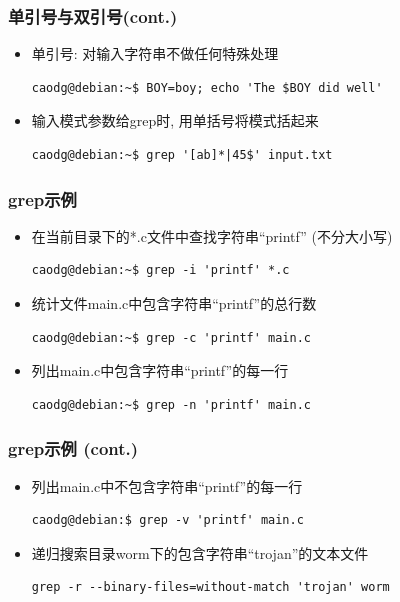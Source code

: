 \documentclass[compress]{beamer}
\begin{document}
\begin{frame}[fragile]
\frametitle{单引号与双引号(cont.)}
\begin{itemize}
\item 单引号: 对输入字符串不做任何特殊处理\\[1em]
\begin{Verbatim}
caodg@debian:~$ BOY=boy; echo 'The $BOY did well'
\end{Verbatim}

\item 输入模式参数给{grep}时, 用单括号将模式括起来\\[1em]
\begin{Verbatim}
caodg@debian:~$ grep '[ab]*|45$' input.txt
\end{Verbatim}
\end{itemize}
\end{frame}

\begin{frame}[fragile]
\frametitle{grep示例}

\begin{itemize}
\item 在当前目录下的*.c文件中查找字符串``printf''
(不分大小写)\\
\begin{Verbatim}
caodg@debian:~$ grep -i 'printf' *.c
\end{Verbatim}

\item 统计文件main.c中包含字符串``printf''的总行数\\
\begin{Verbatim}
caodg@debian:~$ grep -c 'printf' main.c
\end{Verbatim}

\item 列出main.c中包含字符串``printf''的每一行\\
\begin{Verbatim}
caodg@debian:~$ grep -n 'printf' main.c
\end{Verbatim}
\end{itemize}
\end{frame}


\begin{frame}[fragile]
\frametitle{grep示例 (cont.)}

\begin{itemize}
\item 列出main.c中不包含字符串``printf''的每一行\\[1em]
\begin{Verbatim}
caodg@debian:$ grep -v 'printf' main.c
\end{Verbatim}

\item
递归搜索目录worm下的包含字符串``trojan''的文本文件\\[1em]
\begin{Verbatim}
grep -r --binary-files=without-match 'trojan' worm
\end{Verbatim}

\end{itemize}
\end{frame}
\end{document}
